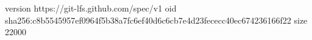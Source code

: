 version https://git-lfs.github.com/spec/v1
oid sha256:c8b5545957ef0964f5b38a7fc6ef40d6c6cb7e4d23fececc40ec674236166f22
size 22000
